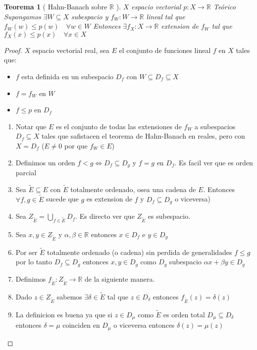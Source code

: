 \documentclass[10pt]{extarticle}
\theoremstyle{break}
\newtheorem{theorem}{Teorema}[section]
\theoremstyle{definition}
\begin{document}
\begin{theorem} [ Hahn-Banach sobre $\mathbb{R}$ ]
$X$ espacio vectorial $p : X\rightarrow \mathbb{R}$ Teórico Supongamos $\exists W\subseteq X$ subespacio y $f_{W}:W\rightarrow\mathbb{R}$ lineal tal que $f_{W}(w)\leq p(w)\quad\forall w\in W$
Entonces $\exists f_{X}:X\rightarrow\mathbb{R}$ extension de $f_{W}$ tal que $f_{X}(x)\leq p(x)\quad\forall x\in X$
\end{theorem}

\begin{proof}
$X$ espacio vectorial real, sea $E$ el conjunto de funciones lineal $f$ en $X$ tales que:
\begin{itemize}
	\item $f$ esta definida en un subespacio $D_{f}$ con $W\subseteq D_{f}\subseteq X$
	\item $f=f_{W}$ en $W$
	\item $f\leq p$ en $D_{f}$
\end{itemize}
\begin{enumerate}
\item Notar que $E$ es el conjunto de todas las extensiones de $f_{W}$ a subespacios $D_{f}\subseteq X$ tales que safistacen el teorema de Hahn-Banach en reales, pero con $X=D_{f}$ ($E\neq 0$ por que $f_{W}\in E$)
\item Definimos un orden $f<g \iff D_{f}\subseteq D_{g}$ y $f=g$ en $D_{f}$. Es facil ver que es orden parcial
\item Sea $\tilde{E} \subseteq E$ con $\tilde{E}$ totalmente ordenado, osea una cadena de $E$. Entonces $\forall f,g\in \tilde{E}$ sucede que $g$ es extension de $f$ y $D_{f}\subseteq D_{g}$ o viceversa)
\item Sea $Z_{\tilde{E}}=\bigcup_{f\in \tilde{E}}D_{f}$. Es directo ver que $Z_{\tilde{E}}$ es subespacio.
\item Sea $x,y\in Z_{\tilde{E}}$ y $\alpha ,\beta\in \mathbb{R}$ entonces $x\in D_{f}$ e $y\in D_{g}$
\item Por ser $\tilde{E}$ totalmente ordenado (o cadena) sin perdida de generalidades $f\leq g$ por lo tanto $D_{f}\subseteq D_{g}$ entonces $x,y\in D_{g}$ como $D_{g}$ subespacio $\alpha x+\beta y\in D_{g}$
\item Definimos $f_{\tilde{E}}:Z_{\tilde{E}}\rightarrow\mathbb{R}$ de la siguiente manera.
\item Dado $z\in Z_{\tilde{E}}$ sabemos $\exists \delta \in \tilde{E}$ tal que $z\in D_{\delta}$ entonces $f_{\tilde{E}}(z)=\delta(z)$
\item La definicion es buena ya que si $z\in D_{\mu}$ como $\tilde{E}$ es orden total $D_{\mu}\subseteq D_{\delta}$ entonces $\delta = \mu$ coinciden en $D_{\mu}$ o viceversa entonces $\delta(z)=\mu(z)$

\end{enumerate}
\end{proof}
\end{document}
